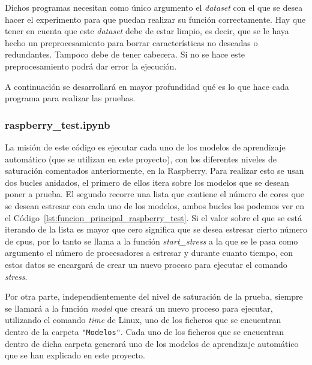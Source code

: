 \documentclass[a4paper, 12pt]{book}
\begin{document}
Dichos programas necesitan como único argumento el \textit{dataset} con el que se desea hacer el experimento para que puedan realizar su función correctamente.
Hay que tener en cuenta que este \textit{dataset} debe de estar limpio, es decir, que se le haya hecho un preprocesamiento para borrar características no deseadas o redundantes. Tampoco debe de tener cabecera. Si no se hace este preprocesamiento podrá dar error la ejecución.

A continuación se desarrollará en mayor profundidad qué es lo que hace cada programa para realizar las pruebas.


\subsubsection{raspberry\_test.ipynb}
\label{subsubsec:programa_pruebas_raspberry}

La misión de este código es ejecutar cada uno de los modelos de aprendizaje automático (que se utilizan en este proyecto), con los diferentes niveles de saturación comentados anteriormente, en la Raspberry. Para realizar esto se usan dos bucles anidados, el primero de ellos itera sobre los modelos que se desean poner a prueba. El segundo recorre una lista que contiene el número de cores que se desean estresar con cada uno de los modelos, ambos bucles los podemos ver en el Código~\ref{lst:funcion_principal_raspberry_test}. Si el valor sobre el que se está iterando de la lista es mayor que cero significa que se desea estresar cierto número de cpus, por lo tanto se llama a la función \textit{start\_stress} a la que se le pasa como argumento el número de procesadores a estresar y durante cuanto tiempo, con estos datos se encargará de crear un nuevo proceso para ejecutar el comando \textit{stress}.

Por otra parte, independientemente del nivel de saturación de la prueba, siempre se llamará a la función \textit{model} que creará un nuevo proceso para ejecutar, utilizando el comando \textit{time} de Linux, uno de los ficheros que se encuentran dentro de la carpeta \texttt{"Modelos"}. Cada uno de los ficheros que se encuentran dentro de dicha carpeta generará uno de los modelos de aprendizaje automático que se han explicado en este proyecto. 
\end{document}
